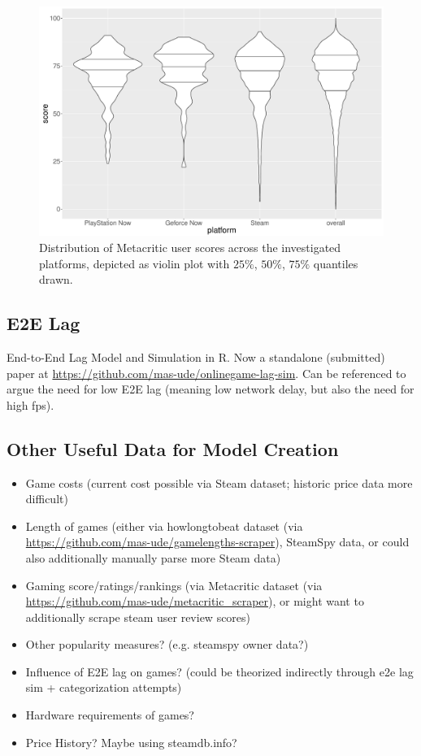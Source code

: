 \begin{figure}[!t]
	\centering
	\includegraphics[width=1.0\columnwidth]{images/scores-by-platform-violin-userscore.pdf}
	\caption{Distribution of Metacritic user scores across the investigated platforms, depicted as violin plot with $25\%$, $50\%$, $75\%$ quantiles drawn.}
\label{fig:userscores-by-platform}
\end{figure}


\subsection{E2E Lag}
End-to-End Lag Model and Simulation in R. Now a standalone (submitted) paper at \url{https://github.com/mas-ude/onlinegame-lag-sim}. Can be referenced to argue the need for low E2E lag (meaning low network delay, but also the need for high fps).


\subsection{Other Useful Data for Model Creation}

\begin{itemize}
	\item Game costs (current cost possible via Steam dataset; historic price data more difficult)
	\item Length of games (either via howlongtobeat dataset (via \url{https://github.com/mas-ude/gamelengths-scraper}), SteamSpy data, or could also additionally manually parse more Steam data)
	\item Gaming score/ratings/rankings (via Metacritic dataset (via \url{https://github.com/mas-ude/metacritic_scraper}), or might want to additionally scrape steam user review scores)
	\item Other popularity measures? (e.g. steamspy owner data?)
	\item Influence of E2E lag on games? (could be theorized indirectly through e2e lag sim + categorization attempts)
	\item Hardware requirements of games?

	\item Price History? Maybe using steamdb.info?
\end{itemize}

